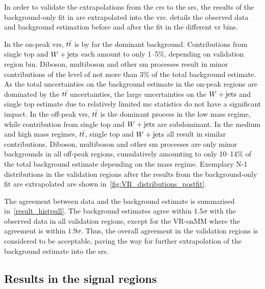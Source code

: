 

In order to validate the extrapolations from the \glspl{cr} to the \glspl{sr}, the results of the background-only fit in are extrapolated into the \glspl{vr}.  details the observed data and background estimation before and after the fit in the different \gls{vr} bins. 

In the on-peak \glspl{vr}, $t\bar{t}$ is by far the dominant background. Contributions from single top and $W+\mathrm{jets}$ each amount to only 1--5\%, depending on validation region bin. Diboson, multiboson and other \gls{sm} processes result in minor contributions of the level of not more than 3\% of the total background estimate. As the total uncertainties on the background estimate in the on-peak regions are dominated by the $t\bar{t}$ uncertainties, the large uncertainties on the $W+\mathrm{jets}$ and single top estimate due to relatively limited \gls{mc} statistics do not have a significant impact. 
In the off-peak \glspl{vr}, $t\bar{t}$ is the dominant process in the low mass regime, while contribution from single top and $W+\mathrm{jets}$ are subdominant. In the medium and high mass regimes, $t\bar{t}$, single top and $W+\mathrm{jets}$ all result in similar contributions. Diboson, multiboson and other \gls{sm} processes are only minor backgrounds in all off-peak regions, cumulatively amounting to only 10--14\% of the total background estimate depending on the mass regime.
Exemplary N-1 distributions in the validation regions after the results from the background-only fit are extrapolated are shown in~\cref{fig:VR_distributions_postfit}.

The agreement between data and the background estimate is summarised in~\cref{result_histpull}.  The background estimates agree within $1.5\sigma$ with the observed data in all validation regions, except for the VR-onMM where the agreement is within $1.9\sigma$. Thus, the overall agreement in the validation regions is considered to be acceptable, paving the way for further extrapolation of the background estimate into the \glspl{sr}.

\subsection{Results in the signal regions}

